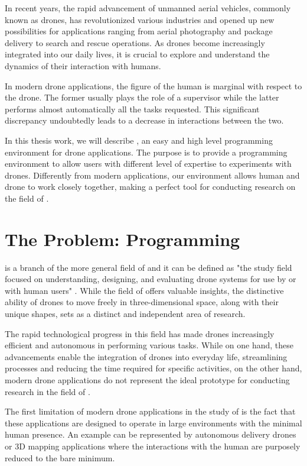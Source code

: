 
In recent years, the rapid advancement of unmanned aerial vehicles, commonly known as drones, has revolutionized various industries and opened up new possibilities for applications ranging from aerial photography and package delivery to search and rescue operations. As drones become increasingly integrated into our daily lives, it is crucial to explore and understand the dynamics of their interaction with humans.

In modern drone applications, the figure of the human is marginal with respect to the drone. The former usually plays the role of a supervisor while the latter performs almost automatically all the tasks requested. This significant discrepancy undoubtedly leads to a decrease in interactions between the two.

In this thesis work, we will describe \easyfly{}, an easy and high level programming environment for drone applications. The purpose is to provide a programming environment to allow users with different level of expertise to experiments with drones. Differently from modern applications, our environment allows human and drone to work closely together, making \easyfly{} a perfect tool for conducting research on the field of \hdi{}.

\section{The Problem: Programming \HDI}
\label{sec:the_problem}
\hdi{} is a branch of the more general field of \hri{} and it can be defined as "the study field focused on understanding, designing, and evaluating drone systems for use by or with human users" \cite{tezza2019hdi}.
While the field of \hri{} offers valuable insights, the distinctive ability of drones to move freely in three-dimensional space, along with their unique shapes, sets \hdi{} as a distinct and independent area of research.

The rapid technological progress in this field has made drones increasingly efficient and autonomous in performing various tasks. While on one hand, these advancements enable the integration of drones into everyday life, streamlining processes and reducing the time required for specific activities, on the other hand, modern drone applications do not represent the ideal prototype for conducting research in the field of \hdi{}.

The first limitation of modern drone applications in the study of \hdi{} is the fact that these applications are designed to operate in large environments with the minimal human presence. An example can be represented by autonomous delivery drones \cite{primeAir} or 3D mapping applications \cite{nex3Dmapping} where the interactions with the human are purposely reduced to the bare minimum.

